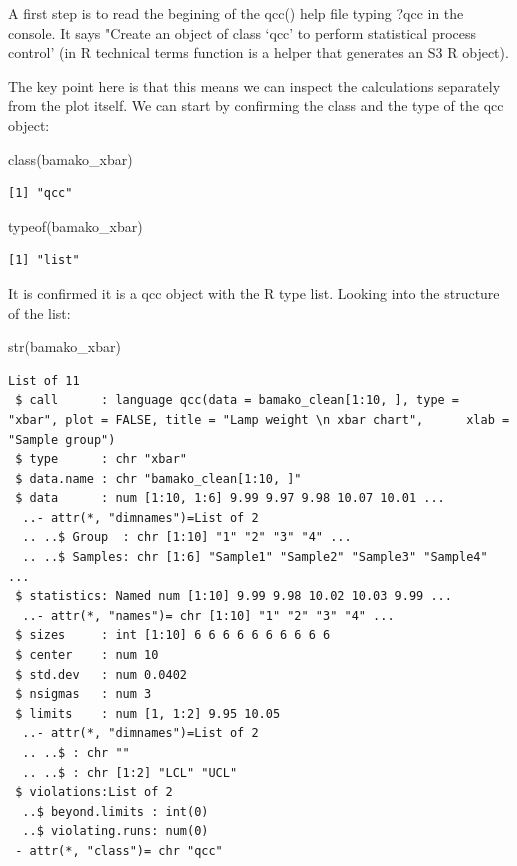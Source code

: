 \documentclass[
]{book}
\newenvironment{Shaded}{\begin{snugshade}}{\end{snugshade}}
\newcommand{\FunctionTok}[1]{\textcolor[rgb]{0.00,0.00,0.00}{#1}}
\newcommand{\NormalTok}[1]{#1}
\begin{document}
A first step is to read the begining of the qcc() help file typing ?qcc in the console. It says "Create an object of class `qcc' to perform statistical process control' (in R technical terms function is a helper that generates an S3 R object).

The key point here is that this means we can inspect the calculations separately from the plot itself. We can start by confirming the class and the type of the qcc object:

\begin{Shaded}
\begin{Highlighting}[]
\FunctionTok{class}\NormalTok{(bamako\_xbar)}
\end{Highlighting}
\end{Shaded}

\begin{verbatim}
[1] "qcc"
\end{verbatim}

\begin{Shaded}
\begin{Highlighting}[]
\FunctionTok{typeof}\NormalTok{(bamako\_xbar)}
\end{Highlighting}
\end{Shaded}

\begin{verbatim}
[1] "list"
\end{verbatim}

It is confirmed it is a qcc object with the R type list. Looking into the structure of the list:

\begin{Shaded}
\begin{Highlighting}[]
\FunctionTok{str}\NormalTok{(bamako\_xbar)}
\end{Highlighting}
\end{Shaded}

\begin{verbatim}
List of 11
 $ call      : language qcc(data = bamako_clean[1:10, ], type = "xbar", plot = FALSE, title = "Lamp weight \n xbar chart",      xlab = "Sample group")
 $ type      : chr "xbar"
 $ data.name : chr "bamako_clean[1:10, ]"
 $ data      : num [1:10, 1:6] 9.99 9.97 9.98 10.07 10.01 ...
  ..- attr(*, "dimnames")=List of 2
  .. ..$ Group  : chr [1:10] "1" "2" "3" "4" ...
  .. ..$ Samples: chr [1:6] "Sample1" "Sample2" "Sample3" "Sample4" ...
 $ statistics: Named num [1:10] 9.99 9.98 10.02 10.03 9.99 ...
  ..- attr(*, "names")= chr [1:10] "1" "2" "3" "4" ...
 $ sizes     : int [1:10] 6 6 6 6 6 6 6 6 6 6
 $ center    : num 10
 $ std.dev   : num 0.0402
 $ nsigmas   : num 3
 $ limits    : num [1, 1:2] 9.95 10.05
  ..- attr(*, "dimnames")=List of 2
  .. ..$ : chr ""
  .. ..$ : chr [1:2] "LCL" "UCL"
 $ violations:List of 2
  ..$ beyond.limits : int(0) 
  ..$ violating.runs: num(0) 
 - attr(*, "class")= chr "qcc"
\end{verbatim}
\end{document}
